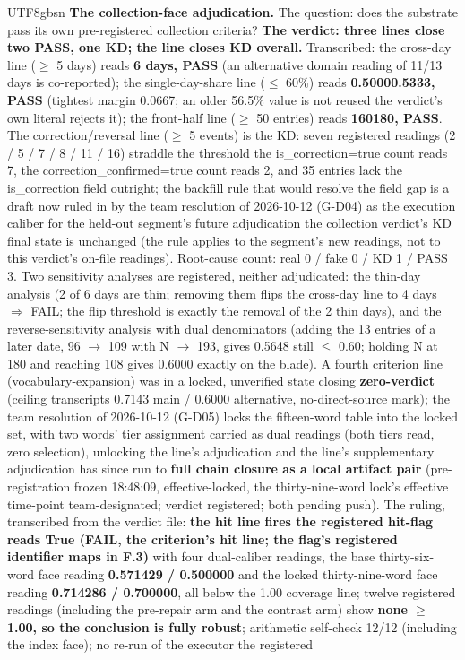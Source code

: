 \documentclass[11pt,letterpaper]{article}
\begin{document}
\begin{CJK}{UTF8}{gbsn}
\textbf{The collection-face adjudication.} The question: does the substrate pass its own pre-registered collection criteria? \textbf{The verdict: three lines close \textemdash{} two PASS, one KD; the line closes KD overall.} Transcribed: the cross-day line (\ensuremath{\geq} 5 days) reads \textbf{6 days, PASS} (an alternative domain reading of 11/13 days is co-reported); the single-day-share line (\ensuremath{\leq} 60\%) reads \textbf{0.5000\textendash{}0.5333, PASS} (tightest margin 0.0667; an older 56.5\% value is not reused \textemdash{} the verdict's own literal rejects it); the front-half line (\ensuremath{\geq} 50 entries) reads \textbf{160\textendash{}180, PASS}. The correction/reversal line (\ensuremath{\geq} 5 events) is the KD: seven registered readings (2 / 5 / 7 / 8 / 11 / 16) straddle the threshold \textemdash{} the is\_correction=true count reads 7, the correction\_confirmed=true count reads 2, and 35 entries lack the is\_correction field outright; the backfill rule that would resolve the field gap is a draft now ruled in by the team resolution of 2026-10-12 (G-D04) as the execution caliber for the held-out segment's future adjudication \textemdash{} the collection verdict's KD final state is unchanged (the rule applies to the segment's new readings, not to this verdict's on-file readings). Root-cause count: real 0 / fake 0 / KD 1 / PASS 3. Two sensitivity analyses are registered, neither adjudicated: the thin-day analysis (2 of 6 days are thin; removing them flips the cross-day line to 4 days \ensuremath{\Rightarrow} FAIL; the flip threshold is exactly the removal of the 2 thin days), and the reverse-sensitivity analysis with dual denominators (adding the 13 entries of a later date, 96 \ensuremath{\to} 109 with N \ensuremath{\to} 193, gives 0.5648 \textemdash{} still \ensuremath{\leq} 0.60; holding N at 180 and reaching 108 gives 0.6000 \textemdash{} exactly on the blade). A fourth criterion line (vocabulary-expansion) was in a locked, unverified state closing \textbf{zero-verdict} (ceiling transcripts 0.7143 main / 0.6000 alternative, no-direct-source mark); the team resolution of 2026-10-12 (G-D05) locks the fifteen-word table into the locked set, with two words' tier assignment carried as dual readings (both tiers read, zero selection), unlocking the line's adjudication \textemdash{} and the line's supplementary adjudication has since run to \textbf{full chain closure as a local artifact pair} (pre-registration frozen 18:48:09, effective-locked, the thirty-nine-word lock's effective time-point team-designated; verdict registered; both pending push). The ruling, transcribed from the verdict file: \textbf{the hit line fires \textemdash{} the registered hit-flag reads True (FAIL, the criterion's hit line; the flag's registered identifier maps in F.3)} \textemdash{} with four dual-caliber readings, the base thirty-six-word face reading \textbf{0.571429 / 0.500000} and the locked thirty-nine-word face reading \textbf{0.714286 / 0.700000}, all below the 1.00 coverage line; twelve registered readings (including the pre-repair arm and the contrast arm) show \textbf{none \ensuremath{\geq} 1.00, so the conclusion is fully robust}; arithmetic self-check 12/12 (including the index face); no re-run of the executor \textemdash{} the registered 
\end{CJK}
\end{document}
